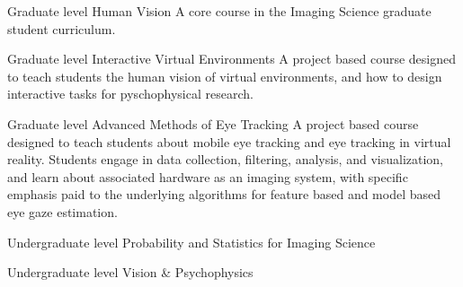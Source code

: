 
\begin{cventries}

    \cventry
    {Graduate level}
    {Human Vision}
    {}
    {}
    {A core course in the Imaging Science graduate student curriculum.}
    
    \cventry
    {Graduate level}
    {Interactive Virtual Environments}
    {}
    {}
    {A project based course designed to teach students the human vision of virtual environments, and how to design interactive tasks for pyschophysical research.}

    \cventry
    {Graduate level}
    {Advanced Methods of Eye Tracking}
    {}
    {}
    {A project based course designed to teach students about mobile eye tracking and eye tracking in virtual reality. Students engage in data collection, filtering, analysis, and visualization, and learn about associated hardware as an imaging system, with specific emphasis paid to the underlying algorithms for feature based and model based eye gaze estimation.}

    
    \cventry
    {Undergraduate level}
    {Probability and Statistics for Imaging Science}
    {}
    {}
    {}

    \vspace{-.5cm}
    \cventry
    {Undergraduate level}
    {Vision \& Psychophysics}
    {}
    {}
    {}

    
\end{cventries}

\vspace{-.7cm}